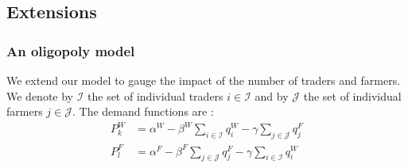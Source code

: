     
    
\subsection{Extensions}
\subsubsection{An oligopoly model}
We extend our model to gauge the impact of the number of traders and farmers. We denote by $\mathcal{I}$ the set of individual traders $i \in \mathcal{I}$ and by $\mathcal{J}$ the set of individual farmers $j \in \mathcal{J}$. The demand functions are : 
\begin{align}
    P_k^W &= \alpha^W - \beta^W \sum_{i \in \mathcal{I}}q^W_i - \gamma \sum_{j \in \mathcal{J}}q^F_j
    \\
    P_l^F &= \alpha^F - \beta^F \sum_{j \in \mathcal{J}}q^F_j - \gamma \sum_{i \in \mathcal{I}}q^W_i
\end{align}
